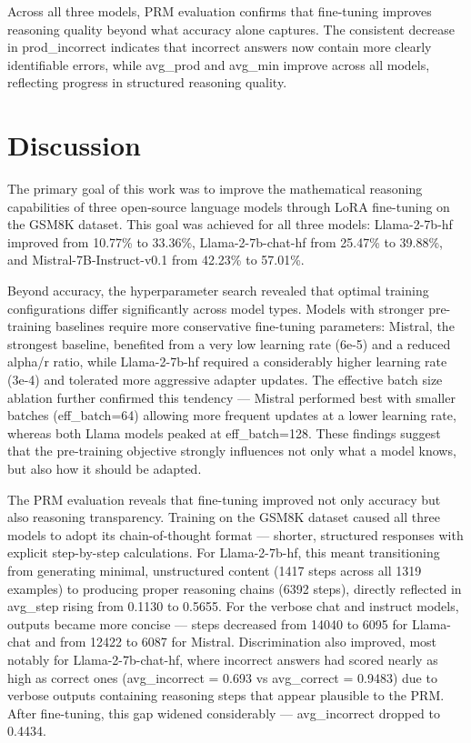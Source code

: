  Across all three models, PRM evaluation confirms
  that fine-tuning improves reasoning quality
  beyond what accuracy alone captures. The consistent decrease in prod\_incorrect
  indicates that incorrect answers now contain
  more clearly identifiable errors, while
  avg\_prod and avg\_min improve across all
  models, reflecting progress in structured
  reasoning quality.
\section{Discussion}
\label{sec:discussion}
The primary goal of this work was to improve
  the mathematical reasoning capabilities of
  three open-source language models through
  LoRA fine-tuning on the GSM8K dataset. This
  goal was achieved for all three models:
  Llama-2-7b-hf improved from 10.77\% to 33.36\%,
  Llama-2-7b-chat-hf from 25.47\% to 39.88\%,
  and Mistral-7B-Instruct-v0.1 from 42.23\% to
  57.01\%.

  Beyond accuracy, the hyperparameter search
  revealed that optimal training configurations
  differ significantly across model types. Models with stronger pre-training
  baselines require more conservative fine-tuning
  parameters: Mistral, the strongest baseline,
  benefited from a very low learning rate (6e-5)
  and a reduced alpha/r ratio, while Llama-2-7b-hf
  required a considerably higher learning rate
  (3e-4) and tolerated more aggressive adapter
  updates. The effective batch size ablation further
  confirmed this tendency --- Mistral performed best
  with smaller batches (eff\_batch=64) allowing
  more frequent updates at a lower learning rate,
  whereas both Llama models peaked at eff\_batch=128.
  These findings suggest that the pre-training
  objective strongly influences not only what a
  model knows, but also how it should be adapted.

    The PRM evaluation reveals that fine-tuning
  improved not only accuracy but also reasoning
  transparency. Training on the GSM8K dataset
  caused all three models to adopt its
  chain-of-thought format --- shorter, structured
  responses with explicit step-by-step calculations.
  For Llama-2-7b-hf, this meant transitioning
  from generating minimal, unstructured content
  (1417 steps across all 1319 examples) to
  producing proper reasoning chains (6392 steps),
  directly reflected in avg\_step rising from
  0.1130 to 0.5655. For the verbose chat and
  instruct models, outputs became more concise ---
  steps decreased from 14040 to 6095 for
  Llama-chat and from 12422 to 6087 for Mistral.
Discrimination also
  improved, most notably for Llama-2-7b-chat-hf,
  where incorrect answers had scored nearly as
  high as correct ones (avg\_incorrect = 0.693
  vs avg\_correct = 0.9483) due to verbose outputs
  containing  reasoning
steps that appear plausible to the PRM. After
  fine-tuning, this gap widened considerably ---
  avg\_incorrect dropped to 0.4434.

